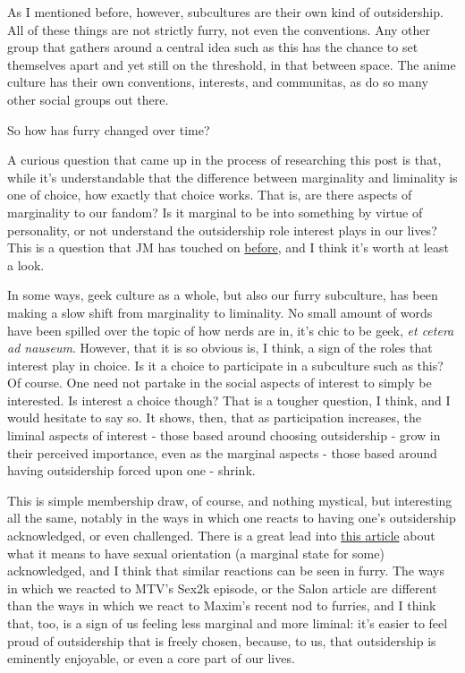 As I mentioned before, however, subcultures are their own kind of
outsidership. All of these things are not strictly furry, not even the
conventions. Any other group that gathers around a central idea such as
this has the chance to set themselves apart and yet still on the
threshold, in that between space. The anime culture has their own
conventions, interests, and communitas, as do so many other social
groups out there.

So how has furry changed over time?

A curious question that came up in the process of researching this post
is that, while it's understandable that the difference between
marginality and liminality is one of choice, how exactly that choice
works. That is, are there aspects of marginality to our fandom? Is it
marginal to be into something by virtue of personality, or not
understand the outsidership role interest plays in our lives? This is a
question that JM has touched on
\href{http://adjectivespecies.com/2012/04/09/geeks/}{before}, and I
think it's worth at least a look.

In some ways, geek culture as a whole, but also our furry subculture,
has been making a slow shift from marginality to liminality. No small
amount of words have been spilled over the topic of how nerds are in,
it's chic to be geek, \emph{et cetera ad nauseum}. However, that it is
so obvious is, I think, a sign of the roles that interest play in
choice. Is it a choice to participate in a subculture such as this? Of
course. One need not partake in the social aspects of interest to simply
be interested. Is interest a choice though? That is a tougher question,
I think, and I would hesitate to say so. It shows, then, that as
participation increases, the liminal aspects of interest - those based
around choosing outsidership - grow in their perceived importance, even
as the marginal aspects - those based around having outsidership forced
upon one - shrink.

This is simple membership draw, of course, and nothing mystical, but
interesting all the same, notably in the ways in which one reacts to
having one's outsidership acknowledged, or even challenged. There is a
great lead into
\href{http://warpcorecritical.wordpress.com/2013/07/17/science-fictions-queer-problem/}{this
article} about what it means to have sexual orientation (a marginal
state for some) acknowledged, and I think that similar reactions can be
seen in furry. The ways in which we reacted to MTV's Sex2k episode, or
the Salon article are different than the ways in which we react to
Maxim's recent nod to furries, and I think that, too, is a sign of us
feeling less marginal and more liminal: it's easier to feel proud of
outsidership that is freely chosen, because, to us, that outsidership is
eminently enjoyable, or even a core part of our lives.

